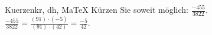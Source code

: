 \begin{MAufgabe}{Kuerzen}{kr, dh, MaTeX}
K\"urzen Sie soweit m\"oglich: $\frac{-455}{3822}$.\\ 
\ifLsg\MLoesung
\quad $\frac{-455}{3822}=\frac{(91)\cdot(-5)}{(91)\cdot(42)}=\frac{-5}{42}$.\else\relax\fi
 \end{MAufgabe}